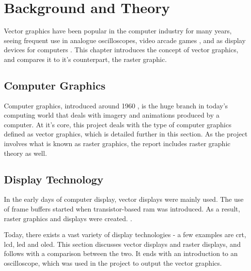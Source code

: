 \chapter{Background and Theory}
\label{chp:background}

Vector graphics have been popular in the computer industry for many years,
seeing frequent use in analogue oscilloscopes, video arcade games \cite{astroids},
and as display devices for computers \cite{ibm2250}\cite{tektronix4010}.
This chapter introduces the concept of vector graphics, and compares it to it's counterpart, the raster graphic.

\section{Computer Graphics}
Computer graphics, introduced around 1960 \cite[sec. 1.1.1]{graphics-visualization-algorithms}, is the huge branch in today's computing world that deals with imagery and animations produced by a computer.
At it's core, this project deals with the type of computer graphics defined as vector graphics, which is detailed further in this section.
As the project involves what is known as raster graphics, the report includes raster graphic theory as well.





\section{Display Technology}
In the early days of computer display, vector displays were mainly used.
The use of frame buffers started when transistor-based \gls{ram} was introduced.
As a result, raster graphics and displays were created. \cite[sec. 1.1]{graphics-visualization-algorithms}.

Today, there exists a vast variety of display technologies - a few examples are \gls{crt}, \gls{lcd}, \gls{led} and \gls{oled}.
This section discusses vector displays and raster displays, and follows with a comparison between the two. It ends with an introduction to an oscilloscope, which was used in the project to output the vector graphics.






